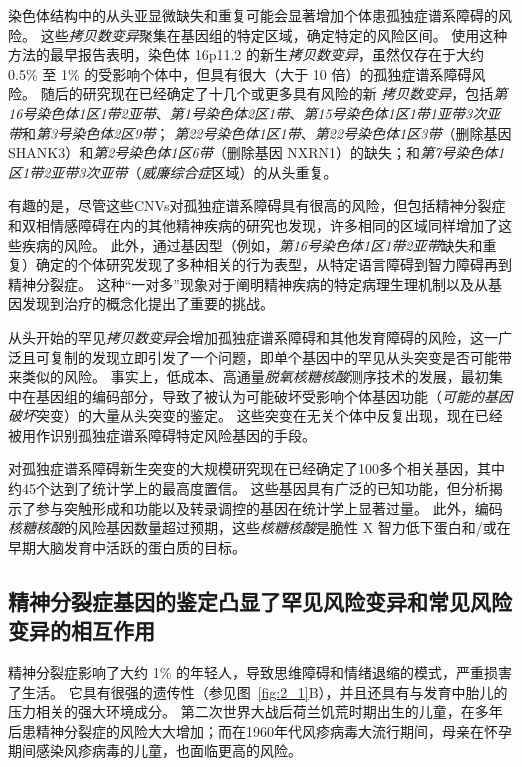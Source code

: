 染色体结构中的从头亚显微缺失和重复可能会显著增加个体患孤独症谱系障碍的风险。
这些\textit{拷贝数变异}聚集在基因组的特定区域，确定特定的风险区间。 使用这种方法的最早报告表明，染色体 16p11.2 的新生\textit{拷贝数变异}，虽然仅存在于大约 0.5\% 至 1\% 的受影响个体中，但具有很大（大于 10 倍）的孤独症谱系障碍风险。
随后的研究现在已经确定了十几个或更多具有风险的新 \textit{拷贝数变异}，包括\textit{第16号染色体1区1带2亚带}、\textit{第1号染色体2区1带}、\textit{第15号染色体1区1带1亚带3次亚带}和\textit{第3号染色体2区9带}；
\textit{第22号染色体1区1带}、\textit{第22号染色体1区3带}（删除基因 SHANK3）和\textit{第2号染色体1区6带}（删除基因 NXRN1）的缺失；和\textit{第7号染色体1区1带2亚带3次亚带}（\textit{威廉综合症}区域）的从头重复。


有趣的是，尽管这些CNVs对孤独症谱系障碍具有很高的风险，但包括精神分裂症和双相情感障碍在内的其他精神疾病的研究也发现，许多相同的区域同样增加了这些疾病的风险。
此外，通过基因型（例如，\textit{第16号染色体1区1带2亚带}缺失和重复）确定的个体研究发现了多种相关的行为表型，从特定语言障碍到智力障碍再到精神分裂症。
这种“一对多”现象对于阐明精神疾病的特定病理生理机制以及从基因发现到治疗的概念化提出了重要的挑战。


从头开始的罕见\textit{拷贝数变异}会增加孤独症谱系障碍和其他发育障碍的风险，这一广泛且可复制的发现立即引发了一个问题，即单个基因中的罕见从头突变是否可能带来类似的风险。
事实上，低成本、高通量\textit{脱氧核糖核酸}测序技术的发展，最初集中在基因组的编码部分，导致了被认为可能破坏受影响个体基因功能（\textit{可能的基因破坏}突变）的大量从头突变的鉴定。
这些突变在无关个体中反复出现，现在已经被用作识别孤独症谱系障碍特定风险基因的手段。

对孤独症谱系障碍新生突变的大规模研究现在已经确定了100多个相关基因，其中约45个达到了统计学上的最高度置信。
这些基因具有广泛的已知功能，但分析揭示了参与突触形成和功能以及转录调控的基因在统计学上显著过量。
此外，编码\textit{核糖核酸}的风险基因数量超过预期，这些\textit{核糖核酸}是脆性 X 智力低下蛋白和/或在早期大脑发育中活跃的蛋白质的目标。



\subsection{精神分裂症基因的鉴定凸显了罕见风险变异和常见风险变异的相互作用}

精神分裂症影响了大约 1\% 的年轻人，导致思维障碍和情绪退缩的模式，严重损害了生活。
它具有很强的遗传性（参见图~\ref{fig:2_1}B），并且还具有与发育中胎儿的压力相关的强大环境成分。
第二次世界大战后荷兰饥荒时期出生的儿童，在多年后患精神分裂症的风险大大增加；而在1960年代风疹病毒大流行期间，母亲在怀孕期间感染风疹病毒的儿童，也面临更高的风险。

